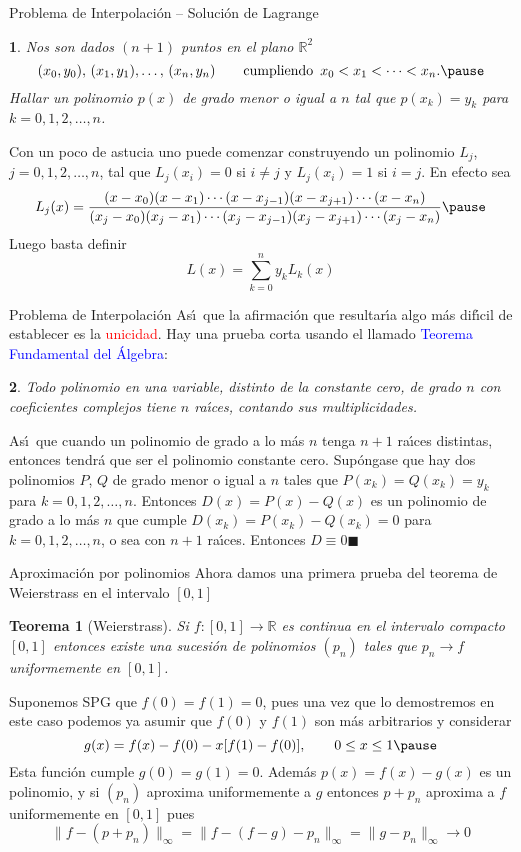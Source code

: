 \documentclass[xcolor=dvipsnames,10pt,handout, draft]{beamer}
\newcommand{\rz}{\mathbb R}
\newtheorem*{afirma}{}
\newtheorem*{teo}{Teorema}
\begin{document}
\begin{frame}{Problema de Interpolaci\'on -- Soluci\'on de Lagrange}
\begin{afirma}
Nos son dados $(n+1)$ puntos en el plano $\rz^2$
$$(x_0,y_0),\,(x_1,y_1),\dots,\,(x_n,y_n)\qquad\text{cumpliendo }\,x_0<x_1<\cdots<x_n.\pause$$
Hallar un polinomio $p(x)$ de grado menor o igual a $n$ tal que $p(x_k)=y_k$ para $k=0,1,2,\dots,n$. \pause
\end{afirma}
Con un poco de astucia uno puede comenzar construyendo un polinomio $L_j$, $j=0,1,2,\dots,n$, tal que $L_j(x_i)=0$ si $i\neq j$ y $L_j(x_i)=1$ si $i=j$.
\pause\vskip5pt
En efecto sea
$$L_j(x)=\frac{(x-x_0)(x-x_1)\cdots(x-x_{j-1})(x-x_{j+1})\cdots(x-x_n)}{(x_j-x_0)(x_j-x_1)\cdots(x_j-x_{j-1})(x_j-x_{j+1})\cdots(x_j-x_n)}\pause$$
Luego basta definir
$$L(x)=\sum_{k=0}^ny_kL_k(x)$$
\end{frame}


\begin{frame}{Problema de Interpolaci\'on}
As\'\i\ que la afirmaci\'on que resultar\'\i a algo m\'as dif\'\i cil de establecer es la \textcolor{red}{unicidad}. \pause\vskip5pt Hay una prueba corta usando el llamado \textcolor{blue}{Teorema Fundamental del \'Algebra}:
\begin{afirma}
Todo polinomio  en una variable, distinto de la constante cero, de grado $n$ con coeficientes complejos tiene $n$ ra\'\i ces, contando sus multiplicidades.\pause
\end{afirma}
As\'\i\ que cuando un polinomio de grado a lo m\'as $n$ tenga $n+1$ ra\'\i ces distintas, entonces tendr\'a que ser el polinomio constante cero.
\vskip5pt\pause
Sup\'ongase que hay dos polinomios $P$, $Q$ de grado menor o igual a $n$ tales que $P(x_k)=Q(x_k)=y_k$ para $k=0,1,2,\dots,n$.
\vskip5pt\pause
Entonces $D(x)=P(x)-Q(x)$ es un polinomio de grado a lo m\'as $n$ que cumple $D(x_k)=P(x_k)-Q(x_k)=0$ para $k=0,1,2,\dots,n$, \pause o sea con $n+1$ ra\'\i ces. Entonces $D\equiv0$\hfill$\blacksquare$
\end{frame}


\begin{frame}{Aproximaci\'on por polinomios}
Ahora damos una primera prueba del teorema de Weierstrass en el intervalo $[0,1]$
\begin{teo}[Weierstrass]
Si $f:[0,1]\to\rz$ es continua en el intervalo compacto $[0,1]$ entonces existe una sucesi\'on de polinomios $(p_n)$ tales que $p_n\to f$ uniformemente en $[0,1]$.\pause
\end{teo}
Suponemos SPG que $f(0)=f(1)=0$, pues una vez que lo demostremos en este caso podemos ya asumir que $f(0)$ y $f(1)$ son m\'as arbitrarios y considerar
$$g(x)=f(x)-f(0)-x[f(1)-f(0)],\qquad0\leq x\leq1\pause$$
Esta funci\'on cumple $g(0)=g(1)=0$. \pause Adem\'as $p(x)=f(x)-g(x)$ es un polinomio, y si $(p_n)$ aproxima uniformemente a $g$ entonces $p+p_n$ aproxima a $f$ uniformemente en $[0,1]$ pues 
$$\|f-(p+p_n)\|_{\infty}=\|f-(f-g)-p_n\|_{\infty}=\|g-p_n\|_\infty\to0$$
\end{frame}
\end{document}
